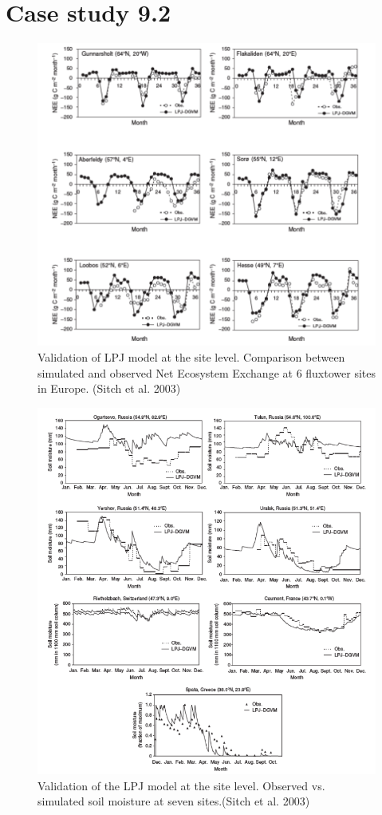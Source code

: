 \documentclass[12pt,oneside]{book}
\begin{document}
\section{Case study 9.2}\label{case-study-9.2}

\begin{figure}

{\centering \includegraphics[width=0.8\linewidth]{figures/chap9/f910_sitch1} 

}

\caption{Validation of LPJ model at the site level. Comparison between simulated and observed Net Ecosystem Exchange at 6 fluxtower sites in Europe. (Sitch et al. 2003) }\label{fig:f910}
\end{figure}

\begin{figure}

{\centering \includegraphics[width=0.8\linewidth]{figures/chap9/f911_sitch2} 

}

\caption{Validation of the LPJ model at the site level. Observed vs. simulated soil moisture at seven sites.(Sitch et al. 2003)}\label{fig:f911}
\end{figure}
\end{document}
